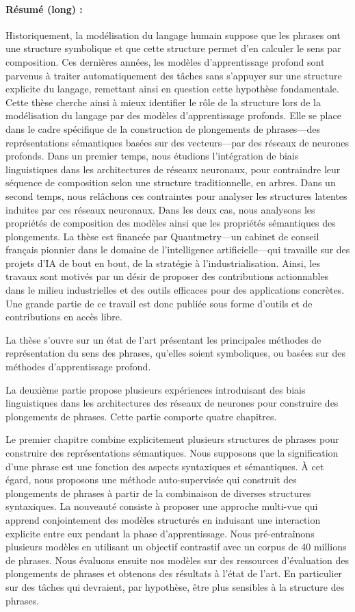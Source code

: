 \paragraph{Résumé (long) :} Historiquement, la modélisation du langage humain suppose que les phrases ont une structure symbolique et que cette structure permet d’en calculer le sens par composition. Ces dernières années, les modèles d’apprentissage profond sont parvenus à traiter automatiquement des tâches sans s’appuyer sur une structure explicite du langage, remettant ainsi en question cette hypothèse fondamentale. Cette thèse cherche ainsi à mieux identifier le rôle de la structure lors de la modélisation du langage par des modèles d’apprentissage profonds. Elle se place dans le cadre spécifique de la construction de plongements de phrases—des représentations sémantiques basées sur des vecteurs—par des réseaux de neurones profonds. Dans un premier temps, nous étudions l’intégration de biais linguistiques dans les architectures de réseaux neuronaux, pour contraindre leur séquence de composition selon une structure traditionnelle, en arbres. Dans un second temps, nous relâchons ces contraintes pour analyser les structures latentes induites par ces réseaux neuronaux. Dans les deux cas, nous analysons les propriétés de composition des modèles ainsi que les propriétés sémantiques des plongements. La thèse est financée par Quantmetry—un cabinet de conseil français pionnier dans le domaine de l'intelligence artificielle—qui travaille sur des projets d'IA de bout en bout, de la stratégie à l'industrialisation. Ainsi, les travaux sont motivés par un désir de proposer des contributions actionnables dans le milieu industrielles et des outils efficaces pour des applications concrètes. Une grande partie de ce travail est donc publiée sous forme d’outils et de contributions en accès libre.

La thèse s’ouvre sur un état de l’art présentant les principales méthodes de représentation du sens des phrases, qu’elles soient symboliques, ou basées sur des méthodes d’apprentissage profond. 

La deuxième partie propose plusieurs expériences introduisant des biais linguistiques dans les architectures des réseaux de neurones pour construire des plongements de phrases. Cette partie comporte quatre chapitres.

Le premier chapitre combine explicitement plusieurs structures de phrases pour construire des représentations sémantiques. Nous supposons que la signification d'une phrase est une fonction des aspects syntaxiques et sémantiques. À cet égard, nous proposons une méthode auto-supervisée qui construit des plongements de phrases à partir de la combinaison de diverses structures syntaxiques. La nouveauté consiste à proposer une approche multi-vue qui apprend conjointement des modèles structurés en induisant une interaction explicite entre eux pendant la phase d'apprentissage. Nous pré-entraînons plusieurs modèles en utilisant un objectif contrastif avec un corpus de 40 millions de phrases. Nous évaluons ensuite nos modèles sur des ressources d’évaluation des plongements de phrases et obtenons des résultats à l’état de l’art. En particulier sur des tâches qui devraient, par hypothèse, être plus sensibles à la structure des phrases. 

